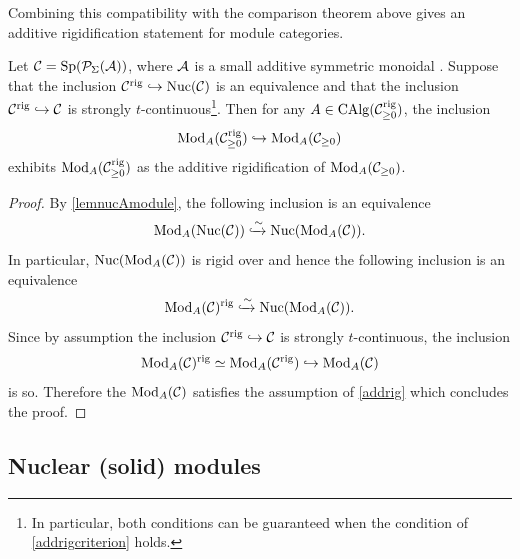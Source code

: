 \documentclass[a4paper,10pt, oneside]{amsart}
\begin{document}
	Combining this compatibility with the comparison theorem above gives an additive rigidification statement for module categories.
	\begin{cor}\label{modnucaddrig}
		Let $\mathcal{C}=\mathrm{Sp}(\mathcal{P}_{\Sigma}(\mathcal{A}))$, where $\mathcal{A}$ is a small additive symmetric monoidal \infcat. Suppose that the inclusion $\mathcal{C}^\mathrm{rig}\hookrightarrow\mathrm{Nuc}(\mathcal{C})$ is an equivalence and that the inclusion 
		$\mathcal{C}^\mathrm{rig}\hookrightarrow \mathcal{C}$ is strongly $t$-continuous\footnote{In particular, both conditions can be guaranteed when the condition of \cref{addrigcriterion} holds.}. Then for any $A\in\operatorname{CAlg}(\mathcal{C}_{\geq0}^\mathrm{rig})$, the inclusion 
		$$\operatorname{Mod}_A(\mathcal{C}_{\geq0}^\mathrm{rig})\hookrightarrow \operatorname{Mod}_A(\mathcal{C}_{\geq0})$$ 
		exhibits $\operatorname{Mod}_A(\mathcal{C}_{\geq0}^\mathrm{rig})$ as the additive rigidification of $\operatorname{Mod}_A(\mathcal{C}_{\geq0})$.
	\end{cor}
	\begin{proof}
		By \cref{lemnucAmodule}, the following inclusion is an equivalence
		$$\operatorname{Mod}_A(\mathrm{Nuc}(\mathcal{C}))\xhookrightarrow{\sim} \mathrm{Nuc}(\operatorname{Mod}_A(\mathcal{C})).$$
		In particular, $\mathrm{Nuc}(\operatorname{Mod}_A(\mathcal{C}))$ is rigid over \opsp and hence the following inclusion is an equivalence
		$$\operatorname{Mod}_A(\mathcal{C})^\mathrm{rig}\xhookrightarrow{\sim} \mathrm{Nuc}(\operatorname{Mod}_A(\mathcal{C})).$$
		Since by assumption the inclusion 
		$\mathcal{C}^\mathrm{rig}\hookrightarrow \mathcal{C}$ is strongly $t$-continuous, the inclusion 
		$$\operatorname{Mod}_A(\mathcal{C})^\mathrm{rig}\simeq\operatorname{Mod}_A(\mathcal{C}^\mathrm{rig})\hookrightarrow \operatorname{Mod}_A(\mathcal{C})$$ is so. Therefore the \infcat $\operatorname{Mod}_A(\mathcal{C})$ satisfies the assumption of \cref{addrig} which concludes the proof.
	\end{proof}
	
\subsection{Nuclear (solid) modules}
\end{document}
